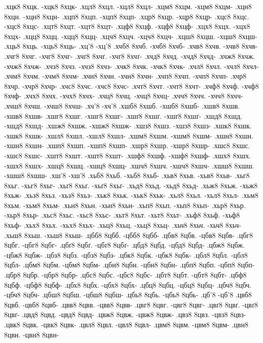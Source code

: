 {.хцк8 8хцк. -хцк8 8хцк-
.хцл8 8хцл. -хцл8 8хцл-
.хцм8 8хцм. -хцм8 8хцм-
.хцн8 8хцн. -хцн8 8хцн-
.хцп8 8хцп. -хцп8 8хцп-
.хцр8 8хцр. -хцр8 8хцр-
.хцс8 8хцс. -хцс8 8хцс-
.хцт8 8хцт. -хцт8 8хцт-
.хцф8 8хцф. -хцф8 8хцф-
.хцх8 8хцх. -хцх8 8хцх-
.хцц8 8хцц. -хцц8 8хцц-
.хцч8 8хцч. -хцч8 8хцч-
.хцш8 8хцш. -хцш8 8хцш-
.хць8 8хць. -хць8 8хць-
.хц'8 -хц'8
.хчб8 8хчб. -хчб8 8хчб-
.хчв8 8хчв. -хчв8 8хчв-
.хчг8 8хчг. -хчг8 8хчг-
.хчґ8 8хчґ. -хчґ8 8хчґ-
.хчд8 8хчд. -хчд8 8хчд-
.хчж8 8хчж. -хчж8 8хчж-
.хчз8 8хчз. -хчз8 8хчз-
.хчк8 8хчк. -хчк8 8хчк-
.хчл8 8хчл. -хчл8 8хчл-
.хчм8 8хчм. -хчм8 8хчм-
.хчн8 8хчн. -хчн8 8хчн-
.хчп8 8хчп. -хчп8 8хчп-
.хчр8 8хчр. -хчр8 8хчр-
.хчс8 8хчс. -хчс8 8хчс-
.хчт8 8хчт. -хчт8 8хчт-
.хчф8 8хчф. -хчф8 8хчф-
.хчх8 8хчх. -хчх8 8хчх-
.хчц8 8хчц. -хчц8 8хчц-
.хчч8 8хчч. -хчч8 8хчч-
.хчш8 8хчш. -хчш8 8хчш-
.хч'8 -хч'8
.хшб8 8хшб. -хшб8 8хшб-
.хшв8 8хшв. -хшв8 8хшв-
.хшг8 8хшг. -хшг8 8хшг-
.хшґ8 8хшґ. -хшґ8 8хшґ-
.хшд8 8хшд. -хшд8 8хшд-
.хшж8 8хшж. -хшж8 8хшж-
.хшз8 8хшз. -хшз8 8хшз-
.хшк8 8хшк. -хшк8 8хшк-
.хшл8 8хшл. -хшл8 8хшл-
.хшм8 8хшм. -хшм8 8хшм-
.хшн8 8хшн. -хшн8 8хшн-
.хшп8 8хшп. -хшп8 8хшп-
.хшр8 8хшр. -хшр8 8хшр-
.хшс8 8хшс. -хшс8 8хшс-
.хшт8 8хшт. -хшт8 8хшт-
.хшф8 8хшф. -хшф8 8хшф-
.хшх8 8хшх. -хшх8 8хшх-
.хшц8 8хшц. -хшц8 8хшц-
.хшч8 8хшч. -хшч8 8хшч-
.хшш8 8хшш. -хшш8 8хшш-
.хш'8 -хш'8
.хьб8 8хьб. -хьб8 8хьб-
.хьв8 8хьв. -хьв8 8хьв-
.хьг8 8хьг. -хьг8 8хьг-
.хьґ8 8хьґ. -хьґ8 8хьґ-
.хьд8 8хьд. -хьд8 8хьд-
.хьж8 8хьж. -хьж8 8хьж-
.хьз8 8хьз. -хьз8 8хьз-
.хьк8 8хьк. -хьк8 8хьк-
.хьл8 8хьл. -хьл8 8хьл-
.хьм8 8хьм. -хьм8 8хьм-
.хьн8 8хьн. -хьн8 8хьн-
.хьп8 8хьп. -хьп8 8хьп-
.хьр8 8хьр. -хьр8 8хьр-
.хьс8 8хьс. -хьс8 8хьс-
.хьт8 8хьт. -хьт8 8хьт-
.хьф8 8хьф. -хьф8 8хьф-
.хьх8 8хьх. -хьх8 8хьх-
.хьц8 8хьц. -хьц8 8хьц-
.хьч8 8хьч. -хьч8 8хьч-
.хьш8 8хьш. -хьш8 8хьш-
.цбб8 8цбб. -цбб8 8цбб-
.цбв8 8цбв. -цбв8 8цбв-
.цбг8 8цбг. -цбг8 8цбг-
.цбґ8 8цбґ. -цбґ8 8цбґ-
.цбд8 8цбд. -цбд8 8цбд-
.цбж8 8цбж. -цбж8 8цбж-
.цбз8 8цбз. -цбз8 8цбз-
.цбк8 8цбк. -цбк8 8цбк-
.цбл8 8цбл. -цбл8 8цбл-
.цбм8 8цбм. -цбм8 8цбм-
.цбн8 8цбн. -цбн8 8цбн-
.цбп8 8цбп. -цбп8 8цбп-
.цбр8 8цбр. -цбр8 8цбр-
.цбс8 8цбс. -цбс8 8цбс-
.цбт8 8цбт. -цбт8 8цбт-
.цбф8 8цбф. -цбф8 8цбф-
.цбх8 8цбх. -цбх8 8цбх-
.цбц8 8цбц. -цбц8 8цбц-
.цбч8 8цбч. -цбч8 8цбч-
.цбш8 8цбш. -цбш8 8цбш-
.цбь8 8цбь. -цбь8 8цбь-
.цб'8 -цб'8
.цвб8 8цвб. -цвб8 8цвб-
.цвв8 8цвв. -цвв8 8цвв-
.цвг8 8цвг. -цвг8 8цвг-
.цвґ8 8цвґ. -цвґ8 8цвґ-
.цвд8 8цвд. -цвд8 8цвд-
.цвж8 8цвж. -цвж8 8цвж-
.цвз8 8цвз. -цвз8 8цвз-
.цвк8 8цвк. -цвк8 8цвк-
.цвл8 8цвл. -цвл8 8цвл-
.цвм8 8цвм. -цвм8 8цвм-
.цвн8 8цвн. -цвн8 8цвн-
}
